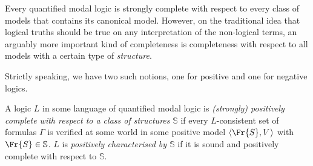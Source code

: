 \documentclass[11pt]{woarticle}
\newcommand{\cmnt}[1]{\iffalse #1 \fi}
\theoremstyle{break}
\theoremstyle{nonumberplain}
\newcommand{\s}[1]{\ensuremath{\mathsf{#1}}}
\newcommand{\1}{\;\,|\;\,}
\renewcommand{\t}[1]{\ensuremath{\langle #1  \makebox[.2ex]{}\rangle}}
\begin{document}
\cmnt{%

  On the other hand, fixing the counterpart relation in this way gets
  inconvenient when we want to characterise stronger logics. Recall
  from section \ref{sec:correspondence} that the schema $\s{T} = \Box
  A \then A$ is valid in a structure $\Fr{S}$ iff (i) every world in
  $\Fr{S}$ can see itself and (ii) every finite sequence of
  individuals at every world is its own counterpart at that world. We
  can check that the canonical model of $\s{P+T}$ satisfies (i) and
  (ii), and therefore that \s{P+T} is characterized by the class of
  positive counterpart models satisfying (i) and (ii).  As for (i),
  suppose there is some world $w$ in the model that can't see
  itself. By definition of canonical models in section \ref{sec:canonical-models},
  this means that there is no transformation $\tau$ such that $A^\tau
  \in w$ whenever $\Box A \in w$. But if $w$ contains all instances of
  $\Box A \then A$, then there is such a transformation, namely the
  identity transformation. Similarly for (ii). Suppose some sequence
  $\t{[x_1]_w,\ldots,[x_n]_w} \in U_w$ is not its own counterpart at
  $w$, i.e.\ there is no $C\in K_{w,w'}$ such that $[x_i]_w C [x_i]_w$
  for all $1 \leq i \leq n$. In the canonical model, this means that
  there is no transformation $\tau$ such that (a) $A^\tau \in w$
  whenever $\Box A \in w$, and (b) for all $1 \leq i \leq n$, there is
  a $y \in [x_i]_w$ with $y^\tau \in [x_i]_w$. (See definition
  \ref{!CM}.) But if $w$ contains all instances of $\Box A \then A$,
  then again the identity transformation satisfies (a) and (b).

} %

Every quantified modal logic is strongly complete with respect to every class of
models that contains its canonical model. However, on the traditional idea that
logical truths should be true on any interpretation of the non-logical terms, an
arguably more important kind of completeness is completeness with respect to all
models with a certain type of \emph{structure}.

Strictly speaking, we have two such notions, one for positive and one for
negative logics.

\begin{definition}{\label{completeness}}
    A logic $L$ in some language of quantified modal logic is
    \emph{(strongly) positively complete with respect to a class of
      structures} $\mathbb{S}$ if every $L$-consistent set of formulas
    $\Gamma$ is verified at some world in some positive model
    $\t{\Fr{S},V}$ with $\Fr{S}\in \mathbb{S}$. $L$ is
    \emph{positively characterised by $\mathbb{S}$} if it is sound and
    positively complete with respect to $\mathbb{S}$.
\end{definition}
\end{document}

